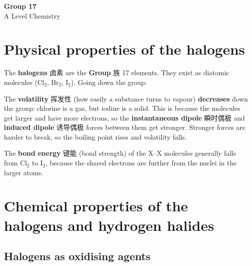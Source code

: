 \documentclass[11pt]{article}
\begin{document}
\begin{center}
  {\LARGE\bfseries Group 17}\\[0.35em]
  {\large A Level Chemistry}
\end{center}
\vspace{0.6em}

\section*{Physical properties of the halogens}

The \textbf{halogens} 卤素 are the \textbf{Group} 族 17 elements. They exist as diatomic molecules ($\text{Cl}_2$, $\text{Br}_2$, $\text{I}_2$). Going down the group:

\begin{center}
\end{center}

The \textbf{volatility} 挥发性 (how easily a substance turns to vapour) \textbf{decreases} down the group: chlorine is a gas, but iodine is a solid. This is because the molecules get larger and have more electrons, so the \textbf{instantaneous dipole} 瞬时偶极 and \textbf{induced dipole} 诱导偶极 forces between them get stronger. Stronger forces are harder to break, so the boiling point rises and volatility falls.

The \textbf{bond energy} 键能 (bond strength) of the $\text{X}\text{–}\text{X}$ molecules generally falls from $\text{Cl}_2$ to $\text{I}_2$, because the shared electrons are further from the nuclei in the larger atoms.

\section*{Chemical properties of the halogens and hydrogen halides}

\subsection*{Halogens as oxidising agents}
\end{document}
